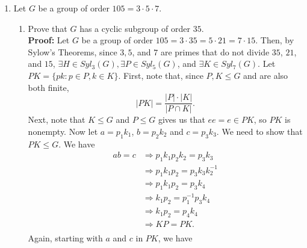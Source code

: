 \documentclass{article}
\begin{document}
\begin{enumerate}
\begin{enumerate}
        $K \trianglelefteq G$ gives us that $G$ is abelian. Then, by the fundamental theorem of finite abelian groups, we have:
        \begin{align*}
            G &\cong \mathbb{Z}_{11^2} \times \mathbb{Z}_{13^2}, \\
            G &\cong \mathbb{Z}_{11} \times \mathbb{Z}_{11} \times \mathbb{Z}_{13} \times \mathbb{Z}_{13}, \\
            G &\cong \mathbb{Z}_{11^2} \times \mathbb{Z}_{13} \times \mathbb{Z}_{13}, \text{ and } \\
            G &\cong \mathbb{Z}_{11} \times \mathbb{Z}_{11} \times \mathbb{Z}_{13^2}. \ \square
        \end{align*}
    \end{enumerate}
    \item Let $G$ be a group of order $105 = 3 \cdot 5 \cdot 7$.
    \begin{enumerate}
        \item Prove that $G$ has a cyclic subgroup of order $35$.\\
        \textbf{Proof:} Let $G$ be a group of order $105 = 3 \cdot 35 = 5 \cdot 21 = 7 \cdot 15$. Then, by Sylow's Theorems, since $3,5$, 
        and $7$ are primes that do not divide $35$, $21$, and $15$, $\exists H \in Syl_3(G), \exists P \in Syl_5(G)$, and 
        $\exists K \in Syl_7(G)$. Let $PK = \{pk: p \in P, k \in K\}$. First, note that, since $P,K \leq G$ and are also both finite, 
        \[
            |PK| = \dfrac{|P| \cdot |K|}{|P \cap K|}.
        \]
        Next, note that $K \leq G$ and $P \leq G$ gives us that $ee = e \in PK$, so $PK$ is nonempty. Now let $a = p_1k_1$, $b = p_2k_2$ 
        and $c = p_3k_3$. We need to show that $PK \leq G$. We have
        \begin{align*}
            ab = c &\Longrightarrow p_1k_1p_2k_2 = p_3k_3 \\
            &\Longrightarrow p_1k_1p_2 = p_3k_3k_2^{-1} \\
            &\Longrightarrow p_1k_1p_2 = p_3k_4 \\
            &\Longrightarrow k_1p_2 = p_1^{-1}p_3k_4 \\
            &\Longrightarrow k_1p_2 = p_4k_4 \\
            &\Longrightarrow KP = PK. \\
        \end{align*}
        Again, starting with $a$ and $c$ in $PK$, we have
        \begin{align*}

\end{align*}
\end{enumerate}
\end{enumerate}
\end{document}
